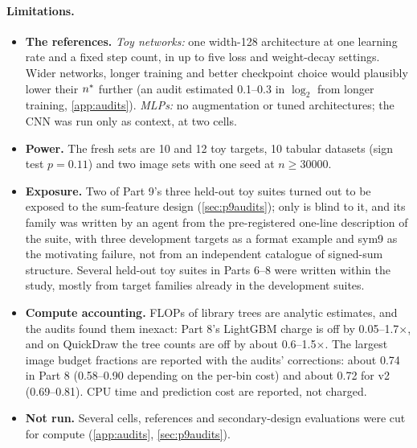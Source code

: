 \paragraph{Limitations.}
\begin{itemize}
\item \textbf{The references.} \emph{Toy networks:} one width-128 architecture at one learning rate and a fixed step count, in up to five loss and weight-decay settings. Wider networks, longer training and better checkpoint choice would plausibly lower their $n^{*}$ further (an audit estimated 0.1--0.3 in $\log_2$ from longer training, \cref{app:audits}). \emph{MLPs:} no augmentation or tuned architectures; the CNN was run only as context, at two cells.
\item \textbf{Power.} The fresh sets are 10 and 12 toy targets, 10 tabular datasets (sign test $p=0.11$) and two image sets with one seed at $n\ge30000$.
\item \textbf{Exposure.} Two of Part 9's three held-out toy suites turned out to be exposed to the sum-feature design (\cref{sec:p9audits}); only  is blind to it, and its family was written by an agent from the pre-registered one-line description of the suite, with three  development targets as a format example and sym9 as the motivating failure, not from an independent catalogue of signed-sum structure. Several held-out toy suites in Parts 6--8 were written within the study, mostly from target families already in the development suites.
\item \textbf{Compute accounting.} FLOPs of library trees are analytic estimates, and the audits found them inexact: Part 8's LightGBM charge is off by 0.05--1.7$\times$, and on QuickDraw the tree counts are off by about 0.6--1.5$\times$. The largest image budget fractions are reported with the audits' corrections: about 0.74 in Part 8 (0.58--0.90 depending on the per-bin cost) and about 0.72 for v2 (0.69--0.81). CPU time and prediction cost are reported, not charged.
\item \textbf{Not run.} Several cells, references and secondary-design evaluations were cut for compute (\cref{app:audits}, \cref{sec:p9audits}).
\end{itemize}

